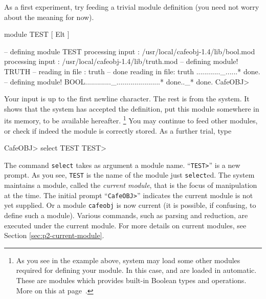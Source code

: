 \documentclass[a4paper]{memoir}
\begin{document}
As a first experiment, try feeding a trivial module definition
(you need not worry about the meaning for now).
\begin{vvtm}
\begin{ccode}
module TEST { [ Elt ] }

-- defining module TEST
processing input : /usr/local/cafeobj-1.4/lib/bool.mod
processing input : /usr/local/cafeobj-1.4/lib/truth.mod
-- defining module! TRUTH
-- reading in file  : truth
-- done reading in file: truth
............_......* done.
-- defining module! BOOL............._......................* done.._* done.
CafeOBJ> 
\end{ccode}
\end{vvtm}
Your input is up to the first newline character. The rest is from the
system. It shows that the system has accepted the definition, put
this module somewhere in its memory, to be available hereafter.
\footnote{As you see in the example above, system may load some other
modules required for defining your module. 
In this case,  and  are loaded in automatic.
These are modules which provides built-in Boolean types and
operations.
More on this at page~\pageref{sec:p2-import-decl}.}
You may continue to feed other modules, or check if indeed the module
is correctly stored. As a further trial, type
\begin{vvtm}
\begin{ccode}
  CafeOBJ> select TEST
  TEST>
\end{ccode}
\end{vvtm}
The command \texttt{select} takes as argument a module name.
``\verb|TEST>|'' is a new prompt. As you see, \verb|TEST| is the name
of the module just \texttt{select}ed. The system maintains
a module, called the \emph{current module},
that is the focus of manipulation at the time. The initial prompt
``\verb|CafeOBJ>|'' indicates the current module is not yet supplied.
Or a module \verb|cafeobj| is now current (it is possible, if confusing,
to define such a module).
Various commands, such as parsing and reduction, are executed under
the current module. For more details on current modules, see Section
\ref{sec:p2-current-module}.

\end{document}
